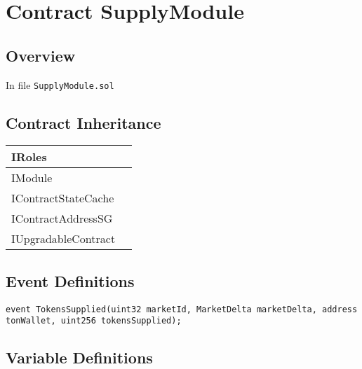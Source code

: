 
\chapter{Contract SupplyModule}

\minitoc

\section{Overview}


In file {\tt SupplyModule.sol}

\section{Contract Inheritance}


\noindent\begin{tabular}{|l|p{5cm}|}\hline
IRoles & \\\hline
IModule & \\\hline
IContractStateCache & \\\hline
IContractAddressSG & \\\hline
IUpgradableContract & \\\hline
\end{tabular}


\section{Event Definitions}


\begin{lstlisting}[firstnumber=19]
    event TokensSupplied(uint32 marketId, MarketDelta marketDelta, address tonWallet, uint256 tokensSupplied);
\end{lstlisting}

\section{Variable Definitions}


